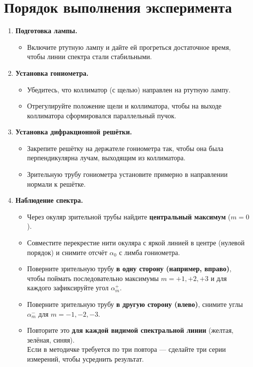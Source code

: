\documentclass[a4paper,12pt]{article}
\begin{document}
\section*{Порядок выполнения эксперимента}
\begin{enumerate}
  \item \textbf{Подготовка лампы.} 
  \begin{itemize}
    \item Включите ртутную лампу и дайте ей прогреться достаточное время, чтобы линии спектра стали стабильными.
  \end{itemize}
  
  \item \textbf{Установка гониометра.}
  \begin{itemize}
    \item Убедитесь, что коллиматор (с щелью) направлен на ртутную лампу.
    \item Отрегулируйте положение щели и коллиматора, чтобы на выходе коллиматора сформировался параллельный пучок.
  \end{itemize}
  
  \item \textbf{Установка дифракционной решётки.}
  \begin{itemize}
    \item Закрепите решётку на держателе гониометра так, чтобы она была перпендикулярна лучам, выходящим из коллиматора.
    \item Зрительную трубу гониометра установите примерно в направлении нормали к решётке.
  \end{itemize}
  
  \item \textbf{Наблюдение спектра.}
  \begin{itemize}
    \item Через окуляр зрительной трубы найдите \textbf{центральный максимум} ($m=0$). 
    \item Совместите перекрестие нити окуляра с яркой линией в центре (нулевой порядок) и снимите отсчёт $\alpha_0$ с лимба гониометра.
    \item Поверните зрительную трубу \textbf{в одну сторону (например, вправо)}, чтобы поймать последовательно максимумы $m=+1, +2, +3$ и для каждого зафиксируйте угол $\alpha_m^+$.
    \item Поверните зрительную трубу \textbf{в другую сторону (влево)}, снимите углы $\alpha_m^-$ для $m=-1, -2, -3$.
    \item Повторите это \textbf{для каждой видимой спектральной линии} (желтая, зелёная, синяя). 
      \\
      Если в методичке требуется по три повтора — сделайте три серии измерений, чтобы усреднить результат.
  \end{itemize}
  

\end{enumerate}
\end{document}
